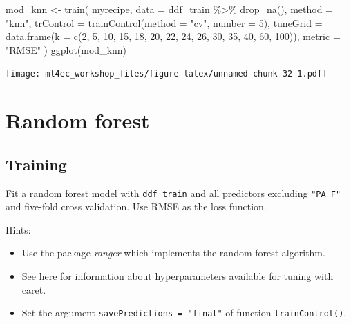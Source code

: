 \documentclass[
]{book}
\newenvironment{Shaded}{\begin{snugshade}}{\end{snugshade}}
\newcommand{\AttributeTok}[1]{\textcolor[rgb]{0.77,0.63,0.00}{#1}}
\newcommand{\DecValTok}[1]{\textcolor[rgb]{0.00,0.00,0.81}{#1}}
\newcommand{\FunctionTok}[1]{\textcolor[rgb]{0.00,0.00,0.00}{#1}}
\newcommand{\NormalTok}[1]{#1}
\newcommand{\OtherTok}[1]{\textcolor[rgb]{0.56,0.35,0.01}{#1}}
\newcommand{\SpecialCharTok}[1]{\textcolor[rgb]{0.00,0.00,0.00}{#1}}
\newcommand{\StringTok}[1]{\textcolor[rgb]{0.31,0.60,0.02}{#1}}
\providecommand{\tightlist}{%
  \setlength{\itemsep}{0pt}\setlength{\parskip}{0pt}}
\begin{document}
\begin{Shaded}
\begin{Highlighting}[]
\NormalTok{mod\_knn }\OtherTok{\textless{}{-}} \FunctionTok{train}\NormalTok{(}
\NormalTok{  myrecipe, }
  \AttributeTok{data =}\NormalTok{ ddf\_train }\SpecialCharTok{\%\textgreater{}\%} 
    \FunctionTok{drop\_na}\NormalTok{(), }
  \AttributeTok{method =} \StringTok{"knn"}\NormalTok{,}
  \AttributeTok{trControl =} \FunctionTok{trainControl}\NormalTok{(}\AttributeTok{method =} \StringTok{"cv"}\NormalTok{, }\AttributeTok{number =} \DecValTok{5}\NormalTok{),}
  \AttributeTok{tuneGrid =} \FunctionTok{data.frame}\NormalTok{(}\AttributeTok{k =} \FunctionTok{c}\NormalTok{(}\DecValTok{2}\NormalTok{, }\DecValTok{5}\NormalTok{, }\DecValTok{10}\NormalTok{, }\DecValTok{15}\NormalTok{, }\DecValTok{18}\NormalTok{, }\DecValTok{20}\NormalTok{, }\DecValTok{22}\NormalTok{, }\DecValTok{24}\NormalTok{, }\DecValTok{26}\NormalTok{, }\DecValTok{30}\NormalTok{, }\DecValTok{35}\NormalTok{, }\DecValTok{40}\NormalTok{, }\DecValTok{60}\NormalTok{, }\DecValTok{100}\NormalTok{)),}
  \AttributeTok{metric =} \StringTok{"RMSE"}
\NormalTok{  )}
\FunctionTok{ggplot}\NormalTok{(mod\_knn)}
\end{Highlighting}
\end{Shaded}

\texttt{[image: ml4ec\_workshop\_files/figure-latex/unnamed-chunk-32-1.pdf]}

\hypertarget{random-forest}{%
\section{Random forest}\label{random-forest}}

\hypertarget{training-3}{%
\subsection{Training}\label{training-3}}

Fit a random forest model with \texttt{ddf\_train} and all predictors excluding \texttt{"PA\_F"} and five-fold cross validation. Use RMSE as the loss function.

Hints:

\begin{itemize}
\tightlist
\item
  Use the package \emph{ranger} which implements the random forest algorithm.
\item
  See \href{https://topepo.github.io/caret/available-models.html}{here} for information about hyperparameters available for tuning with caret.
\item
  Set the argument \texttt{savePredictions\ =\ "final"} of function \texttt{trainControl()}.
\end{itemize}
\end{document}
